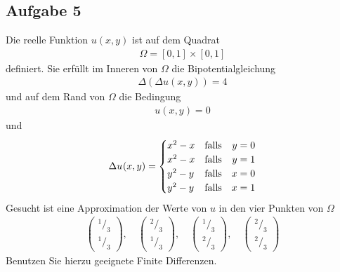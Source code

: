 \documentclass[
	final,
	a4paper,
	oneside,
	parskip=full,
	headings=standardclasses,
	headings=big,
	pointednumbers
]{scrartcl}
\begin{document}
    \subsection*{Aufgabe 5}
    Die reelle Funktion $u{\left(x,  y\right)}$ ist auf dem Quadrat
    \begin{align*}
        \Omega = \left[ 0, 1 \right] \times \left[ 0, 1 \right]
    \end{align*}
    definiert. Sie erfüllt im Inneren von $\Omega$ die Bipotentialgleichung
    \begin{align*}
        \Delta{\left( \Delta u{\left(x,  y\right)} \right)} = 4
    \end{align*}
    und auf dem Rand von $\Omega$ die Bedingung
    \begin{align*}
        u{\left(x,  y\right)} = 0
    \end{align*}
    und
    \begin{align*}
        \du{\left(x,  y\right)} =
        \setlength{\arraycolsep}{0pt}
        \renewcommand{\arraystretch}{1.2}
        \left\{
            \begin{array}{l @{\quad} l r l}
                x^2-x & \text{falls\quad} & y &{}= 0 \\
                x^2-x & \text{falls\quad} & y &{}= 1 \\
                y^2-y & \text{falls\quad} & x &{}= 0 \\
                y^2-y & \text{falls\quad} & x &{}= 1
            \end{array}
        \right.
    \end{align*}
    Gesucht ist eine Approximation der Werte von $u$ in den vier Punkten von $\Omega$
    \begin{align*}
        \begin{pmatrix}
            {^1/_3} \\ {^1/_3}
        \end{pmatrix},\quad
        \begin{pmatrix}
            {^2/_3} \\ {^1/_3}
        \end{pmatrix},\quad
        \begin{pmatrix}
            {^1/_3} \\ {^2/_3}
        \end{pmatrix},\quad
        \begin{pmatrix}
            {^2/_3} \\ {^2/_3}
        \end{pmatrix}
    \end{align*}
    Benutzen Sie hierzu geeignete Finite Differenzen.
\end{document}
